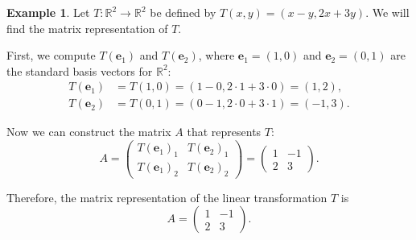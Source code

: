\documentclass[11pt]{article}
\theoremstyle{definition}
\newtheorem{example}[definition]{Example}
\theoremstyle{plain}
\theoremstyle{remark}
\begin{document}
\begin{example}\label{ex:matT}
    Let $T: \mathbb{R}^2 \to \mathbb{R}^2$ be defined by $T(x, y) = (x - y, 2x + 3y)$. We will find the matrix representation of $T$.

    First, we compute $T(\mathbf{e}_1)$ and $T(\mathbf{e}_2)$, where $\mathbf{e}_1 = (1, 0)$ and $\mathbf{e}_2 = (0, 1)$ are the standard basis vectors for $\mathbb{R}^2$:
    \begin{align*}
        T(\mathbf{e}_1) &= T(1, 0) = (1 - 0, 2 \cdot 1 + 3 \cdot 0) = (1, 2), \\
        T(\mathbf{e}_2) &= T(0, 1) = (0 - 1, 2 \cdot 0 + 3 \cdot 1) = (-1, 3).
    \end{align*}

    Now we can construct the matrix $A$ that represents $T$:
    \[A = \begin{pmatrix}
        T(\mathbf{e}_1)_1 & T(\mathbf{e}_2)_1 \\
        T(\mathbf{e}_1)_2 & T(\mathbf{e}_2)_2
    \end{pmatrix} = \begin{pmatrix}
        1 & -1 \\
        2 & 3
    \end{pmatrix}.\]

    Therefore, the matrix representation of the linear transformation $T$ is
    \[A = \begin{pmatrix}
        1 & -1 \\
        2 & 3
    \end{pmatrix}.\]
\end{example}
\end{document}

